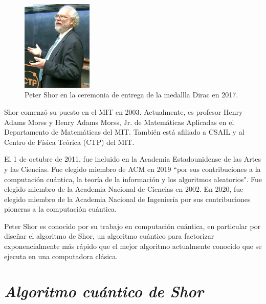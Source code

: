 \documentclass[a4paper,11pt]{article}
\begin{document}
\begin{figure}
    \vspace{-20pt}
    \begin{center}
        \includegraphics[width=0.3\textwidth]{Peter_Shor.png}
    \end{center}
    \vspace{-20pt}
    \caption{Peter Shor en la ceremonia de entrega de la medallla Dirac en 2017.}
    \vspace{-10pt}
\end{figure}

\par Shor comenzó su puesto en el MIT en 2003. Actualmente, es profesor Henry Adams Morss y Henry Adams Morss, Jr. de Matemáticas Aplicadas en el Departamento de Matemáticas del MIT. También está afiliado a CSAIL y al Centro de Física Teórica (CTP) del MIT.

\par El 1 de octubre de 2011, fue incluido en la Academia Estadounidense de las Artes y las Ciencias. Fue elegido miembro de ACM en 2019 ``por sus contribuciones a la computación cuántica, la teoría de la información y los algoritmos aleatorios". Fue elegido miembro de la Academia Nacional de Ciencias en 2002. En 2020, fue elegido miembro de la Academia Nacional de Ingeniería por sus contribuciones pioneras a la computación cuántica.

\par Peter Shor es conocido por su trabajo en computación cuántica, en particular por diseñar el algoritmo de Shor, un algoritmo cuántico para factorizar exponencialmente más rápido que el mejor algoritmo actualmente conocido que se ejecuta en una computadora clásica.

\section*{\center\itshape\large Algoritmo cu\'antico de Shor}
\end{document}
